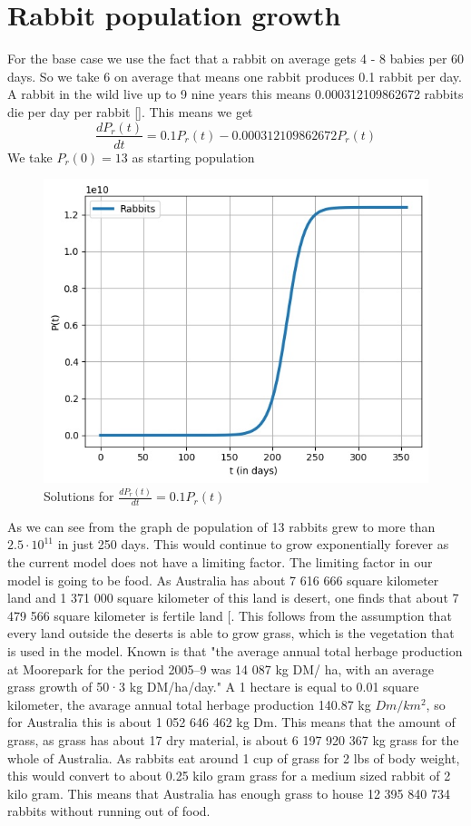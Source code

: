 \documentclass{article}
\begin{document}
\section{Rabbit population growth}
For the base case we use the fact that a rabbit on average gets 4 - 8 babies per 60 days. So we take 6 on average that means one rabbit produces 0.1 rabbit per day. A rabbit in the wild live up to 9 nine years this means 0.000312109862672 rabbits die per day per rabbit [\cite{RabbitsQ}]. This means we get 
$$
\frac{dP_r(t)}{dt} = 0.1P_r(t)-0.000312109862672P_r(t)
$$
We take $P_r(0) = 13$ as starting population
\begin{figure}[ht]
 \centering
	\includegraphics[scale=0.6]{Pictures/unr_rabbitts}
	\caption{Solutions for $\frac{dP_r(t)}{dt} = 0.1P_r(t)$ }
	\label{fig:unr_rabbitts}
\end{figure}
\newpage
As we can see from the graph de population of 13 rabbits grew to more than  $2.5\cdot10^{11}$ in just 250 days. This would continue to grow exponentially forever as the current model does not have a limiting factor. The limiting factor in our model is going to be food. As Australia has about 7 616 666 square kilometer land and 1 371 000 square kilometer of this land is desert, one finds that about 7 479 566 square kilometer is fertile land  [\cite{FirtileLand}. This follows from the assumption that every land outside the deserts is able to grow grass, which is the vegetation that is used in the model. Known is that "the average annual total herbage production at Moorepark for the period 2005–9 was 14 087 kg DM/ ha, with an average grass growth of 50·3 kg DM/ha/day."\cite{Grassgrowth} A 1 hectare is equal to 0.01 square kilometer, the avarage annual total herbage production 140.87 kg $Dm/km^2$, so for Australia this is about 1 052 646 462 kg Dm. This means that the amount of grass, as grass has about 17 dry material, is about 6 197 920 367 kg grass for the whole of Australia.\cite{Grass} As rabbits eat around 1 cup of grass for 2 lbs of body weight, this would convert to about 0.25 kilo gram grass for a medium sized rabbit of 2 kilo gram. This means that Australia has enough grass to house 12 395 840 734 rabbits without running out of food.
\end{document}
